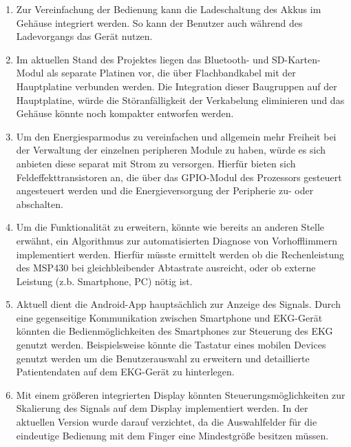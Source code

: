 \begin{enumerate}

\item Zur Vereinfachung der Bedienung kann die Ladeschaltung des Akkus im Gehäuse integriert werden. So kann der Benutzer auch während des Ladevorgangs das Gerät nutzen.

\item Im aktuellen Stand des Projektes liegen das Bluetooth- und SD-Karten-Modul als separate Platinen vor, die über Flachbandkabel mit der Hauptplatine verbunden werden. Die Integration dieser Baugruppen auf der Hauptplatine, würde die Störanfälligkeit der Verkabelung eliminieren und das Gehäuse könnte noch kompakter entworfen werden.

\item Um den Energiesparmodus zu vereinfachen und allgemein mehr Freiheit bei der Verwaltung der einzelnen peripheren Module zu haben, würde es sich anbieten diese separat mit Strom zu versorgen. Hierfür bieten sich Feldeffekttransistoren an, die über das GPIO-Modul des Prozessors gesteuert angesteuert werden und die Energieversorgung der Peripherie zu- oder abschalten.

\item Um die Funktionalität zu erweitern, könnte wie bereits an anderen Stelle erwähnt, ein Algorithmus zur automatisierten Diagnose von Vorhofflimmern implementiert werden. Hierfür müsste ermittelt werden ob die Rechenleistung des MSP430 bei gleichbleibender Abtastrate ausreicht, oder ob externe Leistung (z.b. Smartphone, PC) nötig ist.

\item Aktuell dient die Android-App hauptsächlich zur Anzeige des Signals. Durch eine gegenseitige Kommunikation zwischen Smartphone und EKG-Gerät könnten die Bedienmöglichkeiten des Smartphones zur Steuerung des EKG genutzt werden. Beispielsweise könnte die Tastatur eines mobilen Devices genutzt werden um die Benutzerauswahl zu erweitern und detaillierte Patientendaten auf dem EKG-Gerät zu hinterlegen.

\item Mit einem größeren integrierten Display könnten Steuerungsmöglichkeiten zur Skalierung des Signals auf dem Display implementiert werden. In der aktuellen Version wurde darauf verzichtet, da die Auswahlfelder für die eindeutige Bedienung mit dem Finger eine Mindestgröße besitzen müssen.

\end{enumerate}
